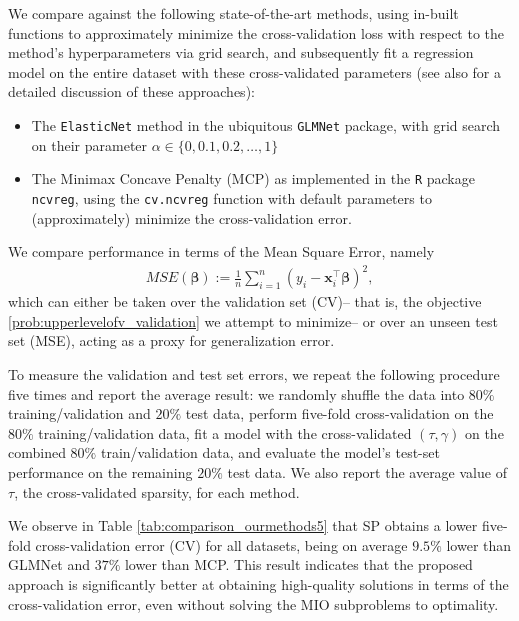 \documentclass[ijoc,noblindrev]{informs3} %
\begin{document}
We compare against the following state-of-the-art methods, using in-built functions to approximately minimize the cross-validation loss with respect to the method's hyperparameters via grid search, and subsequently fit a regression model on the entire dataset with these cross-validated parameters (see also \cite{bertsimas2020sparse2} for a detailed discussion of these approaches):
\begin{itemize}
    \item The \verb|ElasticNet| method in the ubiquitous \verb|GLMNet| package, with grid search on their parameter $\alpha \in \{0, 0.1, 0.2, \ldots, 1\}$%
    \item The Minimax Concave Penalty (MCP) %
    as implemented in the \verb|R| package \verb|ncvreg|, using the \verb|cv.ncvreg| function with %
    default parameters to (approximately) minimize the cross-validation error.
\end{itemize}
We compare performance in terms of the Mean Square Error, namely
\begin{align*}
    MSE(\bm{\beta}):=\frac{1}{n}\sum_{i=1}^n (y_{i}-\bm{x}_{i}^\top \bm{\beta})^2,
\end{align*}
which can either be taken over the validation set (CV)-- that is, the objective \eqref{prob:upperlevelofv_validation} we attempt to minimize-- or over an unseen test set (MSE), acting as a proxy for generalization error. 

To measure the validation and test set errors, we repeat the following procedure five times and report the average result: we randomly shuffle the data into $80\%$ training/validation and $20\%$ test data, perform five-fold cross-validation on the $80\%$ training/validation data, fit a model with the cross-validated $(\tau, \gamma)$ on the combined $80\%$ train/validation data, and evaluate the model's test-set performance on the remaining $20\%$ test data. We also report the average value of $\tau$, the cross-validated sparsity, for each method.

We observe in Table \ref{tab:comparison_ourmethods5} that SP obtains a lower five-fold cross-validation error (CV) for all datasets, being on average $9.5\%$ lower than GLMNet and $37\%$ lower than MCP. This result indicates that the proposed approach is significantly better at obtaining high-quality solutions in terms of the cross-validation error, even without solving the MIO subproblems to optimality. 
\end{document}
